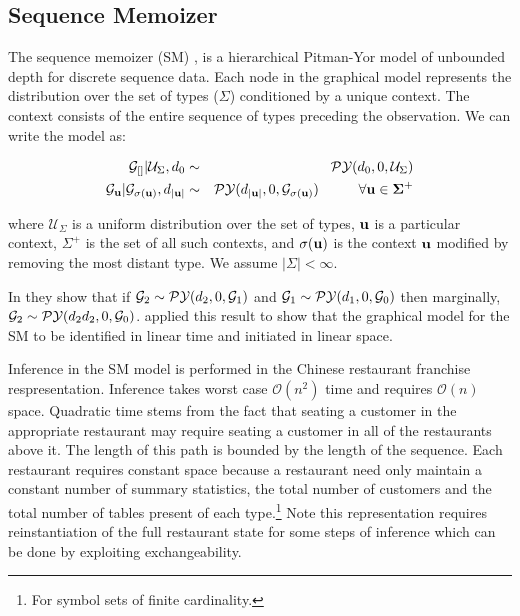 \subsection{Sequence Memoizer}

The sequence memoizer (SM) \cite{wood}, is a hierarchical Pitman-Yor model of unbounded depth for discrete sequence data.  Each node in the graphical model represents the distribution over the set of types ($\Sigma$) conditioned by a unique context.  The context consists of the entire sequence of types preceding the observation.  We can write the model as:

\begin{eqnarray*}
	\G_{[]} | \mathcal{U}_{\Sigma}, d_0 &\sim& \PY(d_0, 0, \mathcal{U}_{\Sigma }) \\
	\G_{\bf{u}} | \G_{\sigma(\bf{u})}, d_{|\bf{u}|} &\sim& \PY(d_{|\bf{u}|}, 0, \G_{\sigma(\bf{u})}) \hspace{1cm} \forall \bf{u} \in \Sigma^+
\end{eqnarray*}

where $\mathcal{U}_{\Sigma }$ is a uniform distribution over the set of types, $\bf{u}$ is a particular context, $\Sigma^+$ is the set of all such contexts, and $\sigma(\bf{u})$ is the context $\bf{u}$ modified by removing the most distant type.  We assume $| \Sigma | < \infty$.

In \cite{pitman} they show that  if $\G_2 \sim \PY(d_2, 0, \G_1)$ and  $\G_1 \sim \PY(d_1, 0, \G_0)$ then marginally, $\G_2 \sim \PY(d_2 d_2, 0, \G_0)$.  \cite{wood} applied this result to show that the graphical model for the SM to be identified in linear time and initiated in linear space.

Inference in the SM model is performed in the Chinese restaurant franchise respresentation. Inference takes worst case $\mathcal{O}(n^2)$ time and requires $\mathcal{O}(n)$ space. Quadratic time stems from the fact that seating a customer in the appropriate restaurant may require seating a customer in all of the restaurants above it.  The length of this path is bounded by the length of the sequence. Each restaurant requires constant space because a restaurant need only maintain a constant number of summary statistics, the total number of customers and the total number of tables present of each type.\footnote{For symbol sets of finite cardinality.} Note this representation requires reinstantiation of the full restaurant state for some steps of inference which can be done by exploiting exchangeability.
